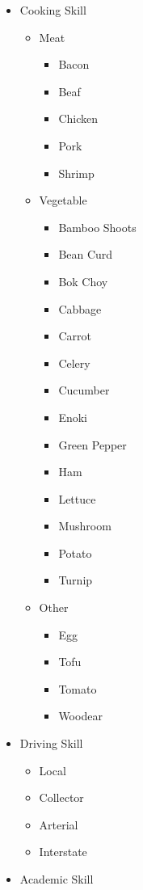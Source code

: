 \documentclass[
]{book}
\providecommand{\tightlist}{%
  \setlength{\itemsep}{0pt}\setlength{\parskip}{0pt}}
\begin{document}
\begin{itemize}
\tightlist
\item
  Cooking Skill

  \begin{itemize}
  \tightlist
  \item
    Meat

    \begin{itemize}
    \tightlist
    \item
      Bacon
    \item
      Beaf
    \item
      Chicken
    \item
      Pork
    \item
      Shrimp
    \end{itemize}
  \item
    Vegetable

    \begin{itemize}
    \tightlist
    \item
      Bamboo Shoots
    \item
      Bean Curd
    \item
      Bok Choy
    \item
      Cabbage
    \item
      Carrot
    \item
      Celery
    \item
      Cucumber
    \item
      Enoki
    \item
      Green Pepper
    \item
      Ham
    \item
      Lettuce
    \item
      Mushroom
    \item
      Potato
    \item
      Turnip
    \end{itemize}
  \item
    Other

    \begin{itemize}
    \tightlist
    \item
      Egg
    \item
      Tofu
    \item
      Tomato
    \item
      Woodear
    \end{itemize}
  \end{itemize}
\item
  Driving Skill

  \begin{itemize}
  \tightlist
  \item
    Local
  \item
    Collector
  \item
    Arterial
  \item
    Interstate
  \end{itemize}
\item
  Academic Skill


\end{itemize}
\end{document}

